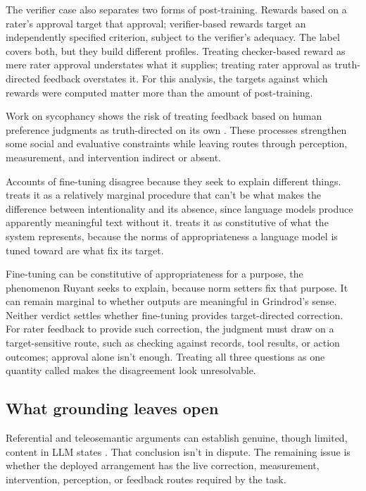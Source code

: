 \documentclass[12pt]{article}
\begin{document}
The verifier case also separates two forms of post-training. Rewards based on a rater's
approval target that approval; verifier-based rewards target an independently specified
criterion, subject to the verifier's adequacy.
The label  covers both, but they build different profiles. Treating checker-based
reward as mere rater approval understates what it supplies; treating rater approval as
truth-directed feedback overstates it. For this analysis, the targets against which rewards
were computed matter more than the amount of post-training.

Work on sycophancy shows the risk of treating feedback based on human preference
judgments as truth-directed on its own \citep{shapira2026rlhf}. These processes strengthen
some social and evaluative constraints while leaving routes through perception,
measurement, and intervention indirect or absent.

Accounts of fine-tuning disagree because they seek to explain different things.
\textcite{grindrod_2024_large_language_models_linguistic_intentionality} treats it as a
relatively marginal procedure that can't be what makes the difference between
intentionality and its absence, since language models produce apparently meaningful text without
it. \textcite{ruyant_2026_what_do_llms_represent} treats it as constitutive of what the
system represents, because the norms of appropriateness a language model is tuned toward are what
fix its target.

Fine-tuning can be constitutive of appropriateness for a purpose, the phenomenon Ruyant
seeks to explain, because norm setters fix that purpose. It can remain
marginal to whether outputs are meaningful in Grindrod's sense. Neither verdict settles
whether fine-tuning provides target-directed correction. For rater feedback to provide such
correction, the judgment must draw on a target-sensitive route, such as checking against
records, tool results, or action outcomes; approval alone isn't enough. Treating all three questions as one quantity called
makes the disagreement look unresolvable.

\subsection{What grounding leaves open}

Referential and teleosemantic arguments can establish genuine, though limited, content in
LLM states \citep{coelho_mollo_milliere_2026_vector_grounding_problem,
mallory_2026_teleosemantics_word_embeddings}. That conclusion isn't in dispute. The
remaining issue is whether the deployed arrangement has the live correction, measurement,
intervention, perception, or feedback routes required by the task.
\end{document}
